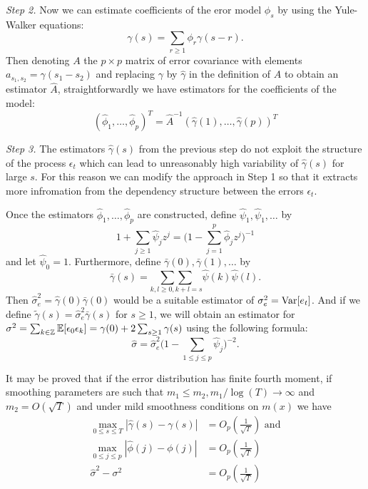 \documentclass[a4paper,12pt]{article}
\numberwithin{equation}{section}
\begin{document}
\textit{Step 2.}
Now we can estimate coefficients of the eror model $\phi_s$ by using the Yule-Walker equations:
\[\gamma(s) = \sum_{r\ge 1}\phi_r\gamma(s-r).\]
Then denoting $A$ the $p\times p$ matrix of error covariance with elements $a_{s_1,s_2} = \gamma(s_1-s_2)$ and replacing $\gamma$ by $\hat{\gamma}$ in the definition of $A$ to obtain an estimator $\hat{A}$, straightforwardly we have estimators for the coefficients of the model:
\[(\hat{\phi}_1, \ldots, \hat{\phi}_p)^T = \hat{A}^{-1} (\hat{\gamma}(1), \ldots, \hat{\gamma}(p))^T\]


\textit{Step 3.}
The estimators $\hat{\gamma}(s)$ from the previous step do not exploit the structure of the process $\epsilon_t$ which can lead to unreasonably high variability of $\hat{\gamma}(s)$ for large $s$. For this reason we can modify the approach in Step 1 so that it extracts more infromation from the dependency structure between the errors $\epsilon_t$.

Once the estimators $\hat{\phi}_1, \ldots, \hat{\phi}_p$ are constructed, define $\hat{\psi}_1, \hat{\psi}_1, \ldots$ by 
\[1 + \sum_{j \ge 1} \hat{\psi}_j z^j = \Big(1 - \sum_{j=1}^p \hat{\phi}_j z^j \Big)^{-1} \]
and let $\hat{\psi}_0 = 1$. Furthermore, define $\bar{\gamma}(0), \bar{\gamma}(1), \ldots$ by
\[\bar{\gamma}(s) = \underset{k, l \ge 0, k+l=s}{\sum\sum} \hat{\psi}(k)\hat{\psi}(l).\]
Then $\hat{\sigma}_e^2 = \hat{\gamma}(0)\bar{\gamma}(0)$ would be a suitable estimator of $\sigma^2_e = \textnormal{Var}[e_t]$. And if we define $\tilde{\gamma}(s) = \hat{\sigma}_e^2 \bar{\gamma}(s)$ for $s\ge 1$, we will obtain an estimator for $\sigma^2 = \sum_{k\in \mathbb{Z}} \mathbb{E}[\epsilon_0 \epsilon_k] = \gamma(0) + 2\sum_{s\ge 1}\gamma(s)$ using the following formula:
\[\hat{\sigma} = \hat{\sigma}^2_e \Big( 1-\sum_{1\le j\le p}\hat{\psi}_j\Big)^{-2}.\]

It may be proved that if the error distribution has finite fourth moment, if smoothing parameters are such that $m_1 \le m_2, m_1/\log(T) \rightarrow \infty$ and $m_2 = O(\sqrt{T})$ and under mild smoothness conditions on $m(x)$ we have 
\begin{align*}
\max_{0\le s \le T} |\hat{\gamma}(s) - \gamma(s)| &= O_p(\frac{1}{\sqrt{T}}) \text{ and} \\
\max_{0\le j \le p} |\hat{\phi}(j) - \phi(j)| &= O_p(\frac{1}{\sqrt{T}}) \\
\hat{\sigma}^2 - \sigma^2 &= O_p (\frac{1}{\sqrt{T}})
\end{align*}
\vspace{1pt}
\end{document}
